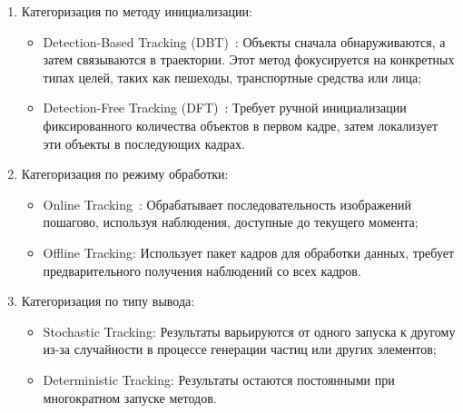 \begin{enumerate}

	\item Категоризация по методу инициализации: 
		
	\begin{itemize}
		
		\item Detection-Based Tracking (DBT)~\cite{Bose2007, Song2010}: Объекты сначала обнаруживаются, а затем связываются в траектории. Этот метод фокусируется на конкретных типах целей, таких как пешеходы, транспортные средства или лица;
		
		\item Detection-Free Tracking (DFT)~\cite{Zhang2013}: Требует ручной инициализации фиксированного количества объектов в первом кадре, затем локализует эти объекты в последующих кадрах.
	
	\end{itemize}
	
	\item Категоризация по режиму обработки:
	
	\begin{itemize}
		
		\item Online Tracking~\cite{Xiang2015}: Обрабатывает последовательность изображений пошагово, используя наблюдения, доступные до текущего момента;
		
		\item Offline Tracking: Использует пакет кадров для обработки данных, требует предварительного получения наблюдений со всех кадров.
		
	\end{itemize}
	
	\item Категоризация по типу вывода:
	
	\begin{itemize}
		
		\item Stochastic Tracking: Результаты варьируются от одного запуска к другому из-за случайности в процессе генерации частиц или других элементов;
		
		\item Deterministic Tracking: Результаты остаются постоянными при многократном запуске методов.
		
	\end{itemize}
	
\end{enumerate}

